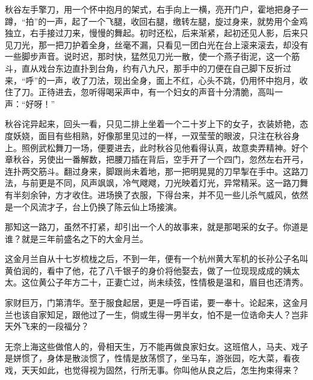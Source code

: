 \documentclass[12pt,UTF8]{ctexbook}
\begin{document}
秋谷左手擎刀，用一个怀中抱月的架式，右手向上一横，亮开门户，霍地把身子一蹲，“拍”的一声，起了一个飞腿，收回右腿，缴转左腿，旋过身来，就势用个金鸡独立，右手接过刀来，慢慢的舞起。初时还松，后来渐紧，起初还见人影，后来只见刀光，那一把刀护着全身，丝毫不漏，只看见一团白光在台上滚来滚去，却没有一些脚步声音。说时迟，那时快，猛然见刀光一散，使一个燕子街泥，这一个筋斗，直从戏台东边直扑到台角，约有八九尺，那手中的刀便在自己脚下反折过来，“呼”的一声，收了刀法，现出全身，面上不红，心头不跳，仍用怀中抱月，收住了刀。正待进去，忽听得喝采声中，有一个妇女的声音十分清脆，高叫一声：“好呀！”

秋谷诧异起来，回头一看，只见二排上坐着一个二十岁上下的女子，衣装娇艳，态度妖娆，面目有些相熟，好像那里见过的一样，一双莹莹的眼波，只注在秋谷身上。照例武松舞刀一场，便要进去，此时秋谷见他看得认真，故意卖弄精神。好个章秋谷，另使出一番解数，把腰刀插在背后，空手开了一个四门，忽然左右开弓，连扑两交筋斗。翻过身来，脚跟尚未着地，那一把明晃晃的刀早掣在手中。这路刀法，与前更是不同，风声飒飒，冷气飕飕，刀光映着灯光，异常精采。这一路刀舞有半刻余钟，方才收住。进场换了衣服，下得台来，并不见一些儿杀气威风，依然是一个风流才子，台上仍换了陈云仙上场接演。

那知这一路刀，虽然不打紧，却引出一个人的故事来，就是那喝采的女子。你道是谁？就是三年前盛名之下的大金月兰。

这金月兰自从十七岁梳栊之后，不到一年，便有一个杭州黄大军机的长孙公子名叫黄伯润的，看中了他，花了八千银子的身价将他娶去，做了一位现现成成的姨太太。这位黄公子年方二十，正妻亡过，尚未续弦，性情极是温和，眉目也还清秀。

家财巨万，门第清华。至于服食起居，更是一呼百诺，要一奉十。论起来，这金月兰也该自家知足，跟他过了一生，倘或生得一男半女，怕不是一位诰命夫人？岂非天外飞来的一段福分？

无奈上海这些做倌人的，骨相天生，万不能再做良家妇女。这班倌人，马夫、戏子是姘惯了，身体是散淡惯了，性情是放荡惯了，坐马车，游张园，吃大菜，看夜戏，天天如此，也觉得视为固然，行所无事。你叫他从良之后，怎生拘束得来？
\end{document}
